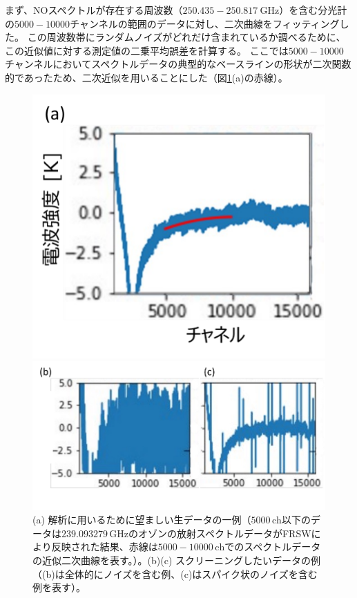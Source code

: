 まず、NOスペクトルが存在する周波数（$250.435-250.817\ \mathrm{GHz}$）を含む分光計の$5000-10000$チャンネルの範囲のデータに対し、二次曲線をフィッティングした。
この周波数帯にランダムノイズがどれだけ含まれているか調べるために、この近似値に対する測定値の二乗平均誤差を計算する。
ここでは$5000-10000$チャンネルにおいてスペクトルデータの典型的なベースラインの形状が二次関数的であったため、二次近似を用いることにした（図\ref{fig:raw_spectrum}(a)の赤線）。
\begin{figure}[htbp]
    \centering
    \begin{minipage}{0.33\linewidth}
        \centering
        \includegraphics[width=\linewidth]{master_thesis_contents/master_thesis_fig/raw_spectrum_good.pdf}
    \end{minipage}
    \begin{minipage}{0.6\linewidth}
        \centering
        \includegraphics[scale=0.6]{master_thesis_contents/master_thesis_fig/raw_spectrum_bad.pdf}
    \end{minipage}
    \caption{(a) 解析に用いるために望ましい生データの一例（$5000\, \mathrm{ch}$以下のデータは$239.093279\, \mathrm{GHz}$のオゾンの放射スペクトルデータがFRSWにより反映された結果、赤線は$5000-10000\, \mathrm{ch}$でのスペクトルデータの近似二次曲線を表す。）。(b)(c) スクリーニングしたいデータの例（(b)は全体的にノイズを含む例、(c)はスパイク状のノイズを含む例を表す）。}
    \label{fig:raw_spectrum}
\end{figure}
